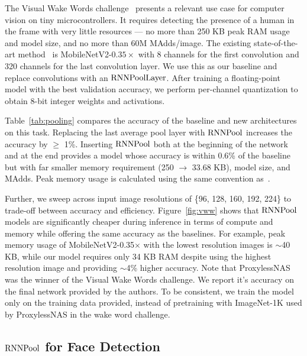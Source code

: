 \documentclass[10pt]{article}
\newcommand{\rpool}{\ensuremath{{\rm RNNPool}}\xspace}
\newcommand{\rpoollayer}{\ensuremath{{\rm RNNPoolLayer}}\xspace}
\newcommand{\alg}{\rpool}
\begin{document}
 The Visual Wake Words challenge~\citep{chowdhery2019visual} presents a
relevant use case for computer vision on tiny microcontrollers. It
requires detecting the presence of a human in the frame with very
little resources --- no more than 250 KB peak RAM usage and model
size, and no more than 60M MAdds/image. The existing state-of-the-art
method~\citep{chowdhery2019visual} is MobileNetV2-$0.35\times$ with 8
channels for the first convolution and 320 channels for the last
convolution layer.  We use this as our baseline and replace
convolutions with an \rpoollayer. After training a floating-point
model with the best validation accuracy, we perform per-channel
quantization to obtain 8-bit integer weights and activations.

Table~\ref{tab:pooling} compares the accuracy of the baseline and new
architectures on this task. Replacing the last average pool layer
with \rpool increases the accuracy by $\ge$ 1\%.  Inserting \rpool
both at the beginning of the network and at the end provides a model
whose accuracy is within $0.6$\% of the baseline but with far smaller
memory requirement (250 $\to$ 33.68 KB), model size, and MAdds.  Peak
memory usage is calculated using the same convention
as~\citep{chowdhery2019visual}.

Further, we sweep across input image resolutions of \{96, 128, 160,
192, 224\} to trade-off between accuracy and
efficiency. Figure~\ref{fig:vww} shows that \rpool models are
significantly cheaper during inference in terms of compute and memory
while offering the same accuracy as the baselines. For example, peak
memory usage of MobileNetV2-0.35$\times$ with the lowest resolution
images is $\sim$40 KB, while our model requires only 34 KB RAM despite
using the highest resolution image and providing $\sim$4\% higher
accuracy. Note that ProxylessNAS~\citep{mit-hanvww} was the winner of
the Visual Wake Words challenge. We report it's accuracy on the final
network provided by the authors. To be consistent, we train the model
only on the training data provided, instead of pretraining with
ImageNet-1K used by ProxylessNAS in the wake word challenge.

\subsection{\alg for Face Detection}
\label{sec:fdexpts}
\end{document}

